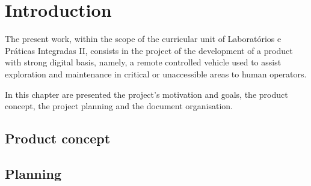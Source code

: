 

%

\chapter{Introduction}
The present work, within the scope of the curricular unit of Laboratórios e
Práticas Integradas II, consists in the project of the development of a product
with strong digital basis, namely, a remote controlled vehicle used to assist
exploration and maintenance in critical or unaccessible areas to human operators.

In this chapter are presented the project's motivation and goals, the product
concept, the project planning and the document organisation.
%
%
%

\section{Product concept}%
\label{sec:product-concept}

%
%
%
%
\section{Planning}%
\label{sec:planning}


%
